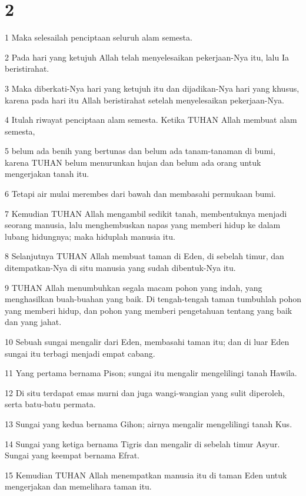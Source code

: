 \chapter{2}

\par 1 Maka selesailah penciptaan seluruh alam semesta.
\par 2 Pada hari yang ketujuh Allah telah menyelesaikan pekerjaan-Nya itu, lalu Ia beristirahat.
\par 3 Maka diberkati-Nya hari yang ketujuh itu dan dijadikan-Nya hari yang khusus, karena pada hari itu Allah beristirahat setelah menyelesaikan pekerjaan-Nya.
\par 4 Itulah riwayat penciptaan alam semesta. Ketika TUHAN Allah membuat alam semesta,
\par 5 belum ada benih yang bertunas dan belum ada tanam-tanaman di bumi, karena TUHAN belum menurunkan hujan dan belum ada orang untuk mengerjakan tanah itu.
\par 6 Tetapi air mulai merembes dari bawah dan membasahi permukaan bumi.
\par 7 Kemudian TUHAN Allah mengambil sedikit tanah, membentuknya menjadi seorang manusia, lalu menghembuskan napas yang memberi hidup ke dalam lubang hidungnya; maka hiduplah manusia itu.
\par 8 Selanjutnya TUHAN Allah membuat taman di Eden, di sebelah timur, dan ditempatkan-Nya di situ manusia yang sudah dibentuk-Nya itu.
\par 9 TUHAN Allah menumbuhkan segala macam pohon yang indah, yang menghasilkan buah-buahan yang baik. Di tengah-tengah taman tumbuhlah pohon yang memberi hidup, dan pohon yang memberi pengetahuan tentang yang baik dan yang jahat.
\par 10 Sebuah sungai mengalir dari Eden, membasahi taman itu; dan di luar Eden sungai itu terbagi menjadi empat cabang.
\par 11 Yang pertama bernama Pison; sungai itu mengalir mengelilingi tanah Hawila.
\par 12 Di situ terdapat emas murni dan juga wangi-wangian yang sulit diperoleh, serta batu-batu permata.
\par 13 Sungai yang kedua bernama Gihon; airnya mengalir mengelilingi tanah Kus.
\par 14 Sungai yang ketiga bernama Tigris dan mengalir di sebelah timur Asyur. Sungai yang keempat bernama Efrat.
\par 15 Kemudian TUHAN Allah menempatkan manusia itu di taman Eden untuk mengerjakan dan memelihara taman itu.
